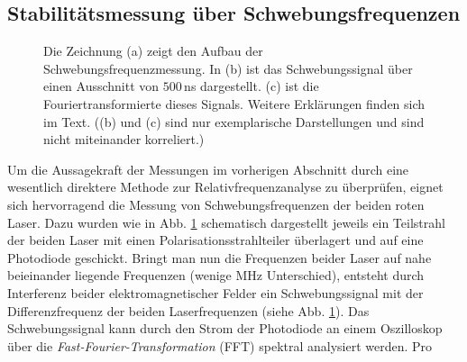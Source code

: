 \subsection{Stabilitätsmessung über
Schwebungsfrequenzen}\label{subsec:beatfrequenzmessung}
\begin{figure}[hp]
 	\centering
 	\footnotesize
	\caption[Beatfrequenzmessung]{Die Zeichnung (a) zeigt den Aufbau der
	Schwebungsfrequenzmessung. In (b) ist das Schwebungssignal über einen
	Ausschnitt von $500\,$ns dargestellt. (c) ist die Fouriertransformierte dieses
	Signals. Weitere Erklärungen finden sich im Text. ((b) und (c) sind nur
	exemplarische Darstellungen und sind nicht miteinander korreliert.)}
	\label{fig:beatfrequenzmessung}
\end{figure}
Um die Aussagekraft der Messungen im vorherigen Abschnitt durch eine wesentlich
direktere Methode zur Relativfrequenzanalyse zu überprüfen, eignet sich hervorragend die
Messung von Schwebungsfrequenzen der beiden roten Laser. Dazu wurden wie in Abb.
\ref{fig:beatfrequenzmessung}
schematisch dargestellt jeweils ein Teilstrahl der beiden Laser mit einen Polarisationsstrahlteiler
überlagert und auf eine Photodiode geschickt. Bringt man nun die Frequenzen
beider Laser auf nahe beieinander liegende Frequenzen (wenige MHz
Unterschied), entsteht durch Interferenz beider
elektromagnetischer Felder ein Schwebungssignal mit der Differenzfrequenz der
beiden Laserfrequenzen (siehe Abb.
\ref{fig:beatfrequenzmessung}). Das
Schwebungssignal kann durch den Strom der Photodiode an einem Oszilloskop über
die \textit{Fast-Fourier-Transformation} (FFT) spektral analysiert werden. Pro
